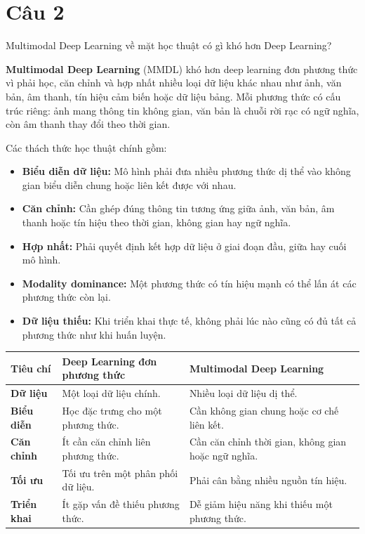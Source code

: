 \section*{Câu 2}
Multimodal Deep Learning về mặt học thuật có gì khó hơn Deep Learning?

\textbf{Multimodal Deep Learning} (MMDL) khó hơn deep learning đơn phương thức vì phải học, căn chỉnh và hợp nhất nhiều loại dữ liệu khác nhau như ảnh, văn bản, âm thanh, tín hiệu cảm biến hoặc dữ liệu bảng. Mỗi phương thức có cấu trúc riêng: ảnh mang thông tin không gian, văn bản là chuỗi rời rạc có ngữ nghĩa, còn âm thanh thay đổi theo thời gian.

Các thách thức học thuật chính gồm:
\begin{itemize}
    \item \textbf{Biểu diễn dữ liệu:} Mô hình phải đưa nhiều phương thức dị thể vào không gian biểu diễn chung hoặc liên kết được với nhau.
    \item \textbf{Căn chỉnh:} Cần ghép đúng thông tin tương ứng giữa ảnh, văn bản, âm thanh hoặc tín hiệu theo thời gian, không gian hay ngữ nghĩa.
    \item \textbf{Hợp nhất:} Phải quyết định kết hợp dữ liệu ở giai đoạn đầu, giữa hay cuối mô hình.
    \item \textbf{Modality dominance:} Một phương thức có tín hiệu mạnh có thể lấn át các phương thức còn lại.
    \item \textbf{Dữ liệu thiếu:} Khi triển khai thực tế, không phải lúc nào cũng có đủ tất cả phương thức như khi huấn luyện.
\end{itemize}

\small
\begin{longtable}{|p{}|p{}|p{}|}
\hline
\textbf{Tiêu chí} & \textbf{Deep Learning đơn phương thức} & \textbf{Multimodal Deep Learning} \\
\hline
\textbf{Dữ liệu} & Một loại dữ liệu chính. & Nhiều loại dữ liệu dị thể. \\
\hline
\textbf{Biểu diễn} & Học đặc trưng cho một phương thức. & Cần không gian chung hoặc cơ chế liên kết. \\
\hline
\textbf{Căn chỉnh} & Ít cần căn chỉnh liên phương thức. & Cần căn chỉnh thời gian, không gian hoặc ngữ nghĩa. \\
\hline
\textbf{Tối ưu} & Tối ưu trên một phân phối dữ liệu. & Phải cân bằng nhiều nguồn tín hiệu. \\
\hline
\textbf{Triển khai} & Ít gặp vấn đề thiếu phương thức. & Dễ giảm hiệu năng khi thiếu một phương thức. \\
\hline
\end{longtable}
\normalsize

